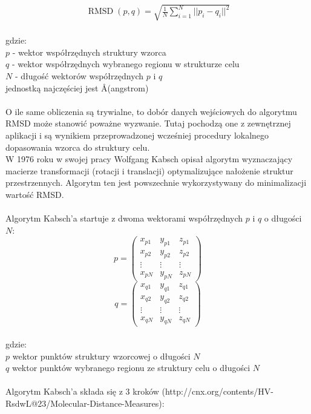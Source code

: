 \documentclass[licencjacka]{pracamgr}
\DeclareMathOperator{\rmsd}{RMSD}
\begin{document}
$$
\begin{array}{lr}
\rmsd(p,q) = \sqrt{\frac{1}{N}\sum_{i=1}^{N}||p_i-q_i||^{2}}
\end{array}
$$
\\
gdzie:
\\
$p$ - wektor współrzędnych struktury wzorca
\\
$q$ - wektor współrzędnych wybranego regionu w strukturze celu
\\
$N$ - długość wektorów współrzędnych $p$ i $q$
\\
jednostką najczęściej jest \AA (angstrom)
\\
\\
O ile same obliczenia są trywialne, to dobór danych wejściowych do algorytmu RMSD może stanowić poważne wyzwanie. Tutaj pochodzą one z zewnętrznej aplikacji i są wynikiem przeprowadzonej wcześniej procedury lokalnego dopasowania wzorca do struktury celu.
\\
W 1976 roku w swojej pracy \cite{kabsch1976}\cite{kabsch1978} Wolfgang Kabsch opisał algorytm wyznaczający macierze transformacji (rotacji i translacji) optymalizujące nałożenie struktur przestrzennych. Algorytm ten jest powszechnie wykorzystywany do minimalizacji wartość RMSD.
\\
\\
Algorytm Kabsch'a startuje z dwoma wektorami współrzędnych $p$ i $q$ o długości $N$:
$$
p=
\begin{pmatrix}
 x_{p1} & y_{p1} & z_{p1} \\
 x_{p2} & y_{p2} & z_{p2} \\
 \vdots & \vdots & \vdots \\
 x_{pN} & y_{pN} & z_{pN}
\end{pmatrix}
$$
$$
q= 
\begin{pmatrix}
 x_{q1} & y_{q1} & z_{q1} \\
 x_{q2} & y_{q2} & z_{q2} \\
 \vdots & \vdots & \vdots \\
 x_{qN} & y_{qN} & z_{qN}
\end{pmatrix}
$$
\\
gdzie:
\\
$p$ wektor punktów struktury wzorcowej o długości $N$
\\
$q$ wektor punktów wybranego regionu ze struktury celu o długości $N$
\\
\\
Algorytm Kabsch'a składa się z 3 kroków (http://cnx.org/contents/HV-RsdwL@23/Molecular-Distance-Measures):
\end{document}
